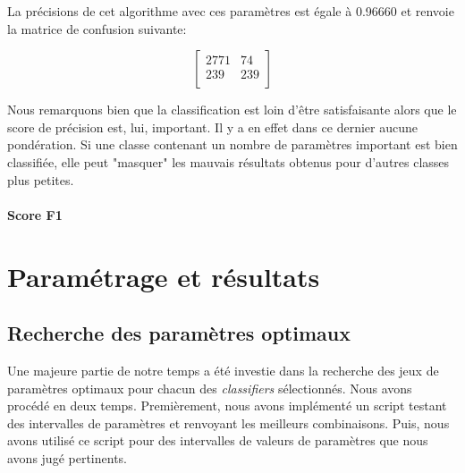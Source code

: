 \documentclass[a4paper]{report}
\begin{document}
\begin{center}
\noindent
{}
\end{center}
\medbreak

La précisions de cet algorithme avec ces paramètres est égale à 0.96660 et renvoie la matrice de confusion suivante:

$$\begin{bmatrix}
2771 & 74 \\ 
239 & 239 \\
\end{bmatrix}$$

\medskip
Nous remarquons bien que la classification est loin d'être satisfaisante alors que le score de précision est, lui, important. Il y a en effet dans ce dernier aucune pondération. Si une classe contenant un nombre de paramètres important est bien classifiée, elle peut "masquer" les mauvais résultats obtenus pour d'autres classes plus petites.

\subsubsection{Score F1}

\chapter{Paramétrage et résultats}

\section{Recherche des paramètres optimaux}

Une majeure partie de notre temps a été investie dans la recherche des jeux de paramètres optimaux pour chacun des \emph{classifiers} sélectionnés. Nous avons procédé en deux temps. Premièrement, nous avons implémenté un script testant des intervalles de paramètres et renvoyant les meilleurs combinaisons. Puis, nous avons utilisé ce script pour des intervalles de valeurs de paramètres que nous avons jugé pertinents.
\end{document}
